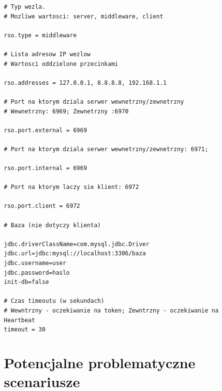 {\begin{lstlisting}
# Typ wezla.
# Mozliwe wartosci: server, middleware, client

rso.type = middleware

# Lista adresow IP wezlow
# Wartosci oddzielone przecinkami

rso.addresses = 127.0.0.1, 8.8.8.8, 192.168.1.1

# Port na ktorym dziala serwer wewnetrzny/zewnetrzny
# Wewnetrzny: 6969; Zewnetrzny :6970

rso.port.external = 6969

# Port na ktorym dziala serwer wewnetrzny/zewnetrzny: 6971;

rso.port.internal = 6969

# Port na ktorym laczy sie klient: 6972

rso.port.client = 6972

# Baza (nie dotyczy klienta)

jdbc.driverClassName=com.mysql.jdbc.Driver
jdbc.url=jdbc:mysql://localhost:3306/baza
jdbc.username=user
jdbc.password=haslo
init-db=false

# Czas timeoutu (w sekundach)
# Wewntrzny - oczekiwanie na token; Zewntrzny - oczekiwanie na Heartbeat
timeout = 30
\end{lstlisting}


\section[Potencjalne problematyczne scenariusze]{Potencjalne problematyczne scenariusze}

}
